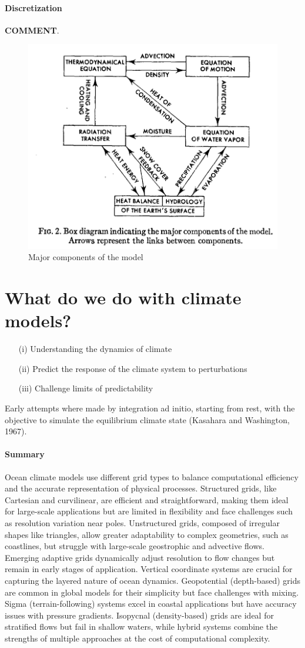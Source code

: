 \paragraph{Discretization} \textbf{COMMENT}.
\begin{figure}[h!]
	\centering
	\includegraphics[width=0.5\linewidth]{uploads/Screenshot 2024-11-24 185214.png}
	\caption{Major components of the model}
	\label{fig:enter-label}
\end{figure}


\section{What do we do with climate models?}
\begin{enumerate}
	\item[(i)] Understanding the dynamics of climate
	\item[(ii)] Predict the response of the climate system to perturbations
	\item[(iii)] Challenge limits of predictability
\end{enumerate}
Early attempts where made by integration ad initio, starting from rest, with the objective to simulate the equilibrium climate state (Kasahara and Washington, 1967).
\paragraph{Summary}
Ocean climate models use different grid types to balance computational efficiency and the accurate representation of physical processes. Structured grids, like Cartesian and curvilinear, are efficient and straightforward, making them ideal for large-scale applications but are limited in flexibility and face challenges such as resolution variation near poles. Unstructured grids, composed of irregular shapes like triangles, allow greater adaptability to complex geometries, such as coastlines, but struggle with large-scale geostrophic and advective flows. Emerging adaptive grids dynamically adjust resolution to flow changes but remain in early stages of application. Vertical coordinate systems are crucial for capturing the layered nature of ocean dynamics. Geopotential (depth-based) grids are common in global models for their simplicity but face challenges with mixing. Sigma (terrain-following) systems excel in coastal applications but have accuracy issues with pressure gradients. Isopycnal (density-based) grids are ideal for stratified flows but fail in shallow waters, while hybrid systems combine the strengths of multiple approaches at the cost of computational complexity.

